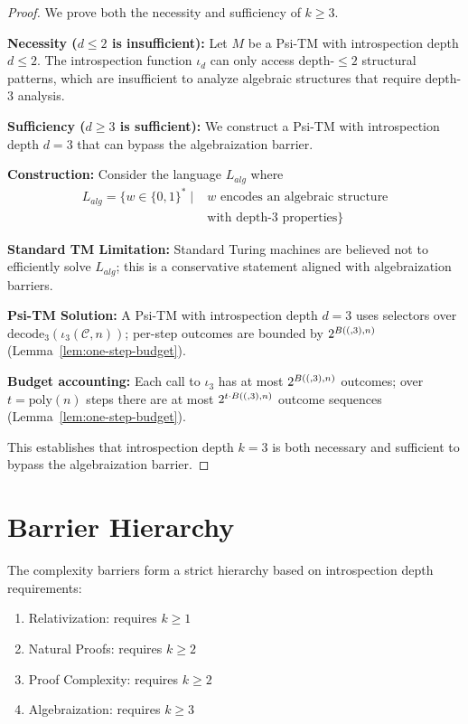 \begin{proof}
We prove both the necessity and sufficiency of $k \geq 3$.

\textbf{Necessity ($d \le 2$ is insufficient):}
Let $M$ be a Psi-TM with introspection depth $d \leq 2$. The introspection function $\iota_d$ can only access depth-$\leq 2$ structural patterns, which are insufficient to analyze algebraic structures that require depth-3 analysis.

\textbf{Sufficiency ($d \ge 3$ is sufficient):}
We construct a Psi-TM with introspection depth $d = 3$ that can bypass the algebraization barrier.

\textbf{Construction:}
Consider the language $L_{alg}$ where
\begin{align}
L_{alg} = \{w \in \{0,1\}^* \mid &\text{$w$ encodes an algebraic structure} \nonumber \\
&\text{with depth-3 properties}\}
\end{align}

\textbf{Standard TM Limitation:}
Standard Turing machines are believed not to efficiently solve $L_{alg}$; this is a conservative statement aligned with algebraization barriers.

\textbf{Psi-TM Solution:}
A Psi-TM with introspection depth $d = 3$ uses selectors over $\mathrm{decode}_3(\iota_3(\mathcal{C},n))$; per-step outcomes are bounded by $2^{B((,3),n)}$ (Lemma~\ref{lem:one-step-budget}).

\textbf{Budget accounting:}
Each call to $\iota_3$ has at most $2^{B((,3),n)}$ outcomes; over $t=\mathrm{poly}(n)$ steps there are at most $2^{t\cdot B((,3),n)}$ outcome sequences (Lemma~\ref{lem:one-step-budget}).

This establishes that introspection depth $k = 3$ is both necessary and sufficient to bypass the algebraization barrier.
\end{proof}

\section{Barrier Hierarchy}

\begin{theorem}
The complexity barriers form a strict hierarchy based on introspection depth requirements:
\begin{enumerate}
\item Relativization: requires $k \geq 1$
\item Natural Proofs: requires $k \geq 2$
\item Proof Complexity: requires $k \geq 2$
\item Algebraization: requires $k \geq 3$
\end{enumerate}
\end{theorem}

